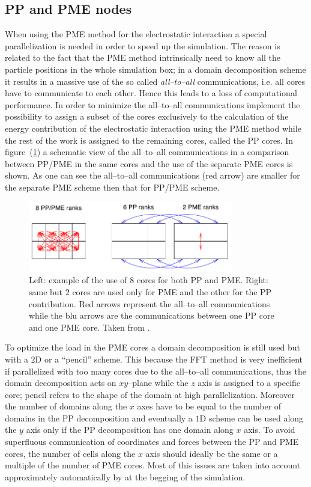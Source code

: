 \subsection{PP and PME nodes}
When using the \ac{PME} method for the electrostatic interaction a special parallelization is needed in order to speed up the simulation. The reason is related to the fact that the \ac{PME} method intrinsically need to know all the particle positions in the whole simulation box; in a domain decomposition scheme it results in a massive use of the so called \textit{all--to--all} communications, i.e. all cores have to communicate to each other. Hence this leads to a loss of computational performance. In order to minimize the all--to--all communications \gromacs implement the possibility to assign a subset of the cores exclusively to the calculation of the energy contribution of the electrostatic interaction using the \ac{PME} method while the rest of the work is assigned to the remaining cores, called the \ac{PP} cores. In figure~(\ref{fig:PMENodes}) a schematic view of the all--to--all communications in a comparison between \ac{PP}/\ac{PME} in the same cores and the use of the separate \ac{PME} cores is shown. As one can see the all--to--all communications (red arrow) are smaller for the separate \acs{PME} scheme then that for \ac{PP}/\ac{PME} scheme.
\begin{figure}[h!t]
	\centering
	\includegraphics[width=0.8\textwidth]{./img/PMENodes}
	\caption{Left: example of the use of $8$ cores for both \acs{PP} and \acs{PME}. Right: same but $2$ cores are used only for \acs{PME} and the other for the \acs{PP} contribution. Red arrows represent the all--to--all communications while the blu arrows are the communications between one \acs{PP} core and one \acs{PME} core. Taken from \cite{gromacsManual}.}
	\label{fig:PMENodes}
\end{figure} 

To optimize the load in the \ac{PME} cores a domain decomposition is still used but with a $2$D or a ``pencil'' scheme. This because the \ac{FFT} method is very inefficient if parallelized with too many cores due to the all--to--all communications, thus the domain decomposition acts on $xy$--plane while the $z$ axis is assigned to a specific core; pencil refers to the shape of the domain at high parallelization. Moreover the number of domains  along the $x$ axes have to be equal to the number of domains in the \ac{PP} decomposition and eventually a $1$D scheme can be used along the $y$ axis only if the \ac{PP} decomposition has one domain along $x$ axis. To avoid superfluous communication of coordinates and forces between the \ac{PP} and \ac{PME} cores, the number of cells along the $x$ axis should ideally be the same or a multiple of the number of \ac{PME} cores. Most of this issues are taken into account approximately automatically by \gromacs at the begging of the simulation.

